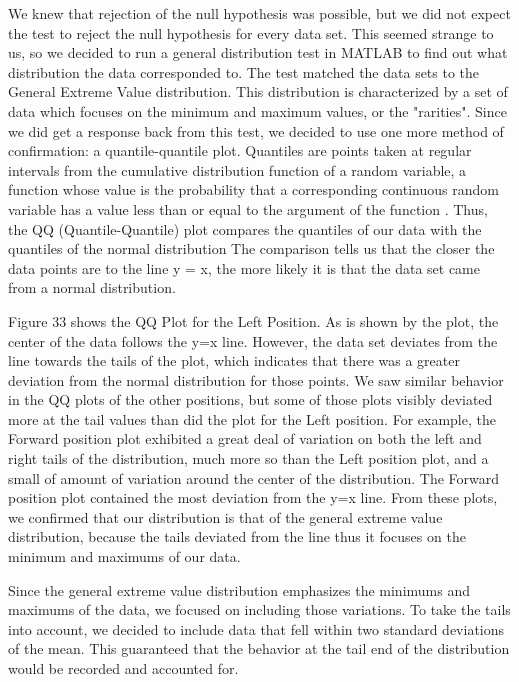 \documentclass[letterpaper,english, 12pt]{article}
\begin{document}
We knew that rejection of the null hypothesis was possible, but we did not expect the test to reject the null hypothesis for every data set. This seemed strange to us, so we decided to run a general distribution test in MATLAB to find out what distribution the data corresponded to.
The test matched the data sets to the General Extreme Value distribution. This distribution is characterized by a set of data which focuses on the minimum and maximum values, or the "rarities".  Since we did get a response back from this test, we decided to use one more method of confirmation: a quantile-quantile plot. Quantiles are points taken at regular intervals from the cumulative distribution function of a random variable, a function whose value is the probability that a corresponding continuous random variable has a value less than or equal to the argument of the function \cite{cit4}. Thus, the QQ (Quantile-Quantile) plot compares the quantiles of our data with the quantiles of the normal distribution The comparison tells us that the closer the data points are to the line y = x, the more likely it is that the data set came from a normal distribution.

Figure 33 shows the QQ Plot for the Left Position. As is shown by the plot, the center of the data follows the y=x line. However, the data set deviates from the line towards the tails of the plot, which indicates that there was a greater deviation from the normal distribution for those points. We saw similar behavior in the QQ plots of the other positions, but some of those plots visibly deviated more at the tail values than did the plot for the Left position. For example, the Forward position plot exhibited a great deal of variation on both the left and right tails of the distribution, much more so than the Left position plot, and a small of amount of variation around the center of the distribution. The Forward position plot contained the most deviation from the y=x line. From these plots, we confirmed that our distribution is that of the general extreme value distribution, because the tails deviated from the line thus it focuses on the minimum and maximums of our data.

Since the general extreme value distribution emphasizes the minimums and maximums of the data, we focused on including those variations. To take the tails into account, we decided to include data that fell within two standard deviations of the mean. This guaranteed that the behavior at the tail end of the distribution would be recorded and accounted for.
\end{document}
